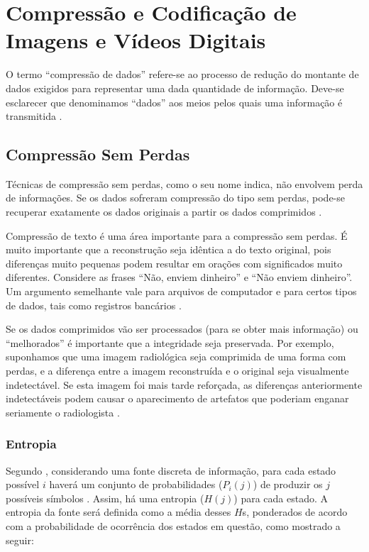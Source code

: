 \section{Compressão e Codificação de Imagens e Vídeos Digitais}

O termo \enquote{compressão de dados} refere-se ao processo de redução do montante de dados exigidos para representar uma dada quantidade de informação. Deve-se esclarecer que denominamos \enquote{dados} aos meios pelos quais uma informação é transmitida \cite{richardson2011h}.

\subsection{Compressão Sem Perdas}
Técnicas de compressão sem perdas, como o seu nome indica, não envolvem perda de informações. Se os dados sofreram compressão do tipo sem perdas, pode-se recuperar exatamente os dados originais a partir  os dados comprimidos \cite{ukrit2011survey}.

Compressão de texto é uma área importante para a compressão sem perdas. É muito importante que a reconstrução seja idêntica a do texto original, pois diferenças muito pequenas podem resultar em orações com significados muito diferentes. Considere as frases \enquote{Não, enviem dinheiro} e \enquote{Não enviem dinheiro}. Um argumento semelhante vale para arquivos de computador e para certos tipos de dados, tais como registros bancários \cite{sayood2012introduction}.

Se os dados comprimidos vão ser processados (para se obter mais informação) ou \enquote{melhorados} é importante que a integridade seja preservada. Por exemplo, suponhamos que uma imagem radiológica seja comprimida de uma forma com perdas, e a diferença entre a imagem reconstruída e o original seja visualmente indetectável. Se esta imagem foi mais tarde reforçada, as diferenças anteriormente indetectáveis podem causar o aparecimento de artefatos que poderiam enganar seriamente o radiologista \cite{sayood2012introduction}.

\subsubsection{Entropia}

Segundo \cite{shannon2001mathematical}, considerando uma fonte discreta de informação, para cada estado possível $i$ haverá um conjunto de probabilidades ($P_i(j)$) de produzir os $j$ possíveis símbolos . Assim, há uma entropia ($H(j)$) para cada estado. A entropia da fonte será definida como a média desses $H$s, ponderados de acordo com a probabilidade de ocorrência dos estados em questão, como mostrado a seguir:

